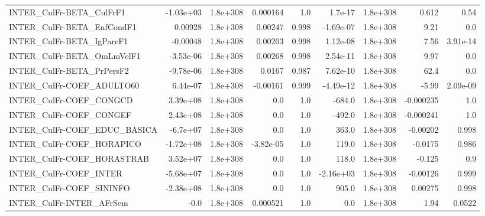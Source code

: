 \begin{tabular}{lrrrrrrrr}
INTER\_CulFr-BETA\_CulFrF1              &   -1.03e+03 &     1.8e+308 &   0.000164 &      1.0 &    1.7e-17 &    1.8e+308 &        0.612 &          0.54 \\
INTER\_CulFr-BETA\_EnfCondF1            &     0.00928 &     1.8e+308 &    0.00247 &    0.998 &  -1.69e-07 &    1.8e+308 &         9.21 &           0.0 \\
INTER\_CulFr-BETA\_IgPareF1             &    -0.00048 &     1.8e+308 &    0.00203 &    0.998 &   1.12e-08 &    1.8e+308 &         7.56 &      3.91e-14 \\
INTER\_CulFr-BETA\_OmLmVelF1            &   -3.53e-06 &     1.8e+308 &    0.00268 &    0.998 &   2.54e-11 &    1.8e+308 &         9.97 &           0.0 \\
INTER\_CulFr-BETA\_PrPersF2             &   -9.78e-06 &     1.8e+308 &     0.0167 &    0.987 &   7.62e-10 &    1.8e+308 &         62.4 &           0.0 \\
INTER\_CulFr-COEF\_ADULTO60             &    6.44e-07 &     1.8e+308 &   -0.00161 &    0.999 &  -4.49e-12 &    1.8e+308 &        -5.99 &      2.09e-09 \\
INTER\_CulFr-COEF\_CONGCD               &    3.39e+08 &     1.8e+308 &        0.0 &      1.0 &     -684.0 &    1.8e+308 &    -0.000235 &           1.0 \\
INTER\_CulFr-COEF\_CONGEF               &    2.43e+08 &     1.8e+308 &        0.0 &      1.0 &     -492.0 &    1.8e+308 &    -0.000241 &           1.0 \\
INTER\_CulFr-COEF\_EDUC\_BASICA          &    -6.7e+07 &     1.8e+308 &        0.0 &      1.0 &      363.0 &    1.8e+308 &     -0.00202 &         0.998 \\
INTER\_CulFr-COEF\_HORAPICO             &   -1.72e+08 &     1.8e+308 &  -3.82e-05 &      1.0 &      119.0 &    1.8e+308 &      -0.0175 &         0.986 \\
INTER\_CulFr-COEF\_HORASTRAB            &    3.52e+07 &     1.8e+308 &        0.0 &      1.0 &      118.0 &    1.8e+308 &       -0.125 &           0.9 \\
INTER\_CulFr-COEF\_INTER                &   -5.68e+07 &     1.8e+308 &        0.0 &      1.0 &  -2.16e+03 &    1.8e+308 &     -0.00126 &         0.999 \\
INTER\_CulFr-COEF\_SININFO              &   -2.38e+08 &     1.8e+308 &        0.0 &      1.0 &      905.0 &    1.8e+308 &      0.00275 &         0.998 \\
INTER\_CulFr-INTER\_AFrSem              &        -0.0 &     1.8e+308 &   0.000521 &      1.0 &        0.0 &    1.8e+308 &         1.94 &        0.0522 \\

\end{tabular}
